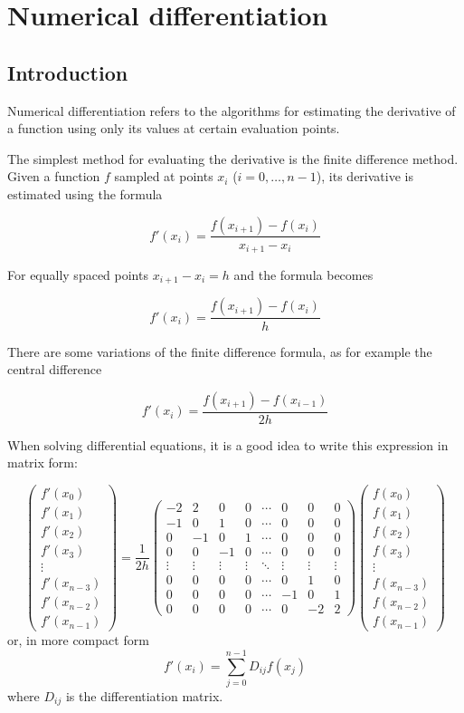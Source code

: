 \chapter{Numerical differentiation}

\section{Introduction}

Numerical differentiation refers to the algorithms for estimating the derivative of a function using only its 
values at certain evaluation points.

The simplest method for evaluating the derivative is the finite difference method. Given a function $f$
sampled at points $x_i$ ($i=0,\ldots,n-1$), its derivative is estimated using the formula

$$f'(x_i)=\frac{f(x_{i+1})-f(x_i)}{x_{i+1}-x_i}$$

For equally spaced points $x_{i+1}-x_i=h$ and the formula becomes

$$f'(x_i)=\frac{f(x_{i+1})-f(x_i)}{h}$$

There are some variations of the finite difference formula, as for example the central difference

$$f'(x_i)=\frac{f(x_{i+1})-f(x_{i-1})}{2h}$$

When solving differential equations, it is a good idea to write this expression in matrix form:

$$\left(\begin{array}{c}
f'(x_0)\\f'(x_1)\\f'(x_2)\\f'(x_3)\\\vdots\\f'(x_{n-3})\\f'(x_{n-2})\\f'(x_{n-1})
\end{array}
\right)=
\frac{1}{2h}\left(
\begin{array}{cccccccc}
-2& 2& 0& 0&\cdots&0&0&0\\
-1& 0& 1& 0&\cdots&0&0&0\\
 0&-1& 0& 1&\cdots&0&0&0\\
 0& 0&-1& 0&\cdots&0&0&0\\ 
\vdots&\vdots&\vdots&\vdots&\ddots&\vdots&\vdots&\vdots\\
 0& 0& 0& 0&\cdots&0&1&0\\ 
 0& 0& 0& 0&\cdots&-1&0&1\\
 0& 0& 0& 0&\cdots&0&-2&2
\end{array}
\right)
\left(\begin{array}{c}
f(x_0)\\f(x_1)\\f(x_2)\\f(x_3)\\\vdots\\f(x_{n-3})\\f(x_{n-2})\\f(x_{n-1})
\end{array}
\right)$$
or, in more compact form
$$f'(x_i)=\sum_{j=0}^{n-1} D_{ij} f(x_j)$$
where $D_{ij}$ is the differentiation matrix.

